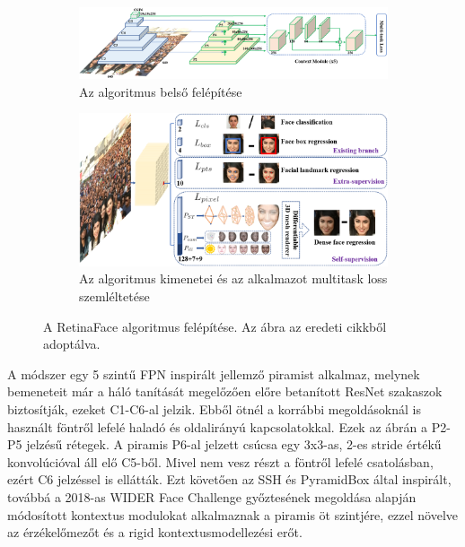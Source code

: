 \begin{figure}[h]
    \centering
    \begin{subfigure}[b]{\linewidth}
        \includegraphics[width=\linewidth]{figures/retinaface_framework.png}
        \caption{Az algoritmus belső felépítése}
    \end{subfigure}
    \begin{subfigure}[b]{0.75\linewidth}
        \includegraphics[width=\linewidth]{figures/retinaface_multitaskloss.png}
        \caption{Az algoritmus kimenetei és az alkalmazot multitask loss szemléltetése}
    \end{subfigure}
    \caption{A RetinaFace algoritmus felépítése. Az ábra az eredeti cikkből\cite{deng_retinaface_2019} adoptálva.}
    \label{fig:retinaface}
\end{figure}

A módszer egy 5 szintű FPN inspirált jellemző piramist alkalmaz, melynek bemeneteit már a háló tanítását megelőzően előre betanított ResNet szakaszok biztosítják, ezeket C1-C6-al jelzik.
Ebből ötnél a korrábbi megoldásoknál \cite{lin_feature_2017,lin_focal_2018} is használt föntről lefelé haladó és oldalirányú kapcsolatokkal. Ezek az ábrán a P2-P5 jelzésű rétegek. A piramis P6-al jelzett csúcsa egy 3x3-as, 2-es stride értékű konvolúcióval áll elő C5-ből. Mivel nem vesz részt a föntről lefelé csatolásban, ezért C6 jelzéssel is ellátták. Ezt követően az SSH\cite{najibi_ssh_2017} és PyramidBox\cite{tang_pyramidbox_2018} által inspirált, továbbá a 2018-as WIDER Face Challenge győztesének megoldása\cite{loy_wider_2019} alapján módosított kontextus modulokat alkalmaznak a piramis öt szintjére, ezzel növelve az érzékelőmezőt és a rigid kontextusmodellezési erőt.

